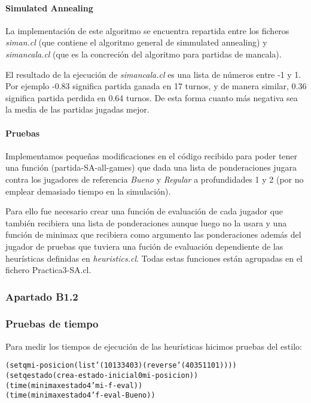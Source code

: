 \documentclass[nochap]{apuntes}
\begin{document}
\paragraph{Simulated Annealing}
La implementación de este algoritmo se encuentra repartida entre los ficheros \textit{siman.cl} (que contiene el algoritmo general de simmulated annealing) y \textit{simancala.cl} (que es la concreción del algoritmo para partidas de mancala).

El resultado de la ejecución de \textit{simancala.cl} es una lista de números entre -1 y 1. Por ejemplo -0.83 significa partida ganada en 17 turnos, y de manera similar, 0.36 significa partida perdida en 0.64 turnos. De esta forma cuanto más negativa sea la media de las partidas jugadas mejor. 


\paragraph{Pruebas}

Implementamos pequeñas modificaciones en el código recibido para poder tener una función (partida-SA-all-games) que dada una lista de ponderaciones jugara contra los jugadores de referencia \textit{Bueno} y \textit{Regular} a profundidades 1 y 2 (por no emplear demasiado tiempo en la simulación). 

Para ello fue necesario crear una función de evaluación de cada jugador que también recibiera una lista de ponderaciones aunque luego no la usara y una función de minimax que recibiera como argumento las ponderaciones además del jugador de pruebas que tuviera una fución de evaluación dependiente de las heurísticas definidas en \textit{heuristics.cl}. Todas estas funciones están agrupadas en el fichero Practica3-SA.cl. 


\subsubsection*{Apartado B1.2}
\subsubsection*{Pruebas de tiempo}
Para medir los tiempos de ejecución de las heurísticas hicimos pruebas del estilo:
\begin{alltt}
(setq mi-posicion (list '(1 0 1 3 3 4 0 3) (reverse '(4 0 3 5 1 1 0 1))))
(setq estado (crea-estado-inicial 0 mi-posicion))
(time (minimax estado 4 'mi-f-eval))
(time (minimax estado 4 'f-eval-Bueno))
\end{alltt}
\end{document}
